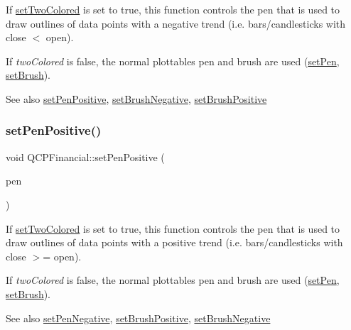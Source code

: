 If \mbox{\hyperlink{class_q_c_p_financial_a138e44aac160a17a9676652e240c5f08}{set\+Two\+Colored}} is set to true, this function controls the pen that is used to draw outlines of data points with a negative trend (i.\+e. bars/candlesticks with close $<$ open).

If {\itshape two\+Colored} is false, the normal plottable\textquotesingle{}s pen and brush are used (\mbox{\hyperlink{class_q_c_p_abstract_plottable_ab74b09ae4c0e7e13142fe4b5bf46cac7}{set\+Pen}}, \mbox{\hyperlink{class_q_c_p_abstract_plottable_a7a4b92144dca6453a1f0f210e27edc74}{set\+Brush}}).

\begin{DoxySeeAlso}{See also}
\mbox{\hyperlink{class_q_c_p_financial_ac58aa3adc7a35aab0088764b840683e5}{set\+Pen\+Positive}}, \mbox{\hyperlink{class_q_c_p_financial_a8bbdd87629f9144b3ef51af660c0961a}{set\+Brush\+Negative}}, \mbox{\hyperlink{class_q_c_p_financial_a5ebff2b1764efd07cc44942e67821829}{set\+Brush\+Positive}} 
\end{DoxySeeAlso}
\mbox{\label{class_q_c_p_financial_ac58aa3adc7a35aab0088764b840683e5}} 
\subsubsection{\texorpdfstring{setPenPositive()}{setPenPositive()}}
{\footnotesize\ttfamily void Q\+C\+P\+Financial\+::set\+Pen\+Positive (\begin{DoxyParamCaption}\item[{const Q\+Pen \&}]{pen }\end{DoxyParamCaption})}

If \mbox{\hyperlink{class_q_c_p_financial_a138e44aac160a17a9676652e240c5f08}{set\+Two\+Colored}} is set to true, this function controls the pen that is used to draw outlines of data points with a positive trend (i.\+e. bars/candlesticks with close $>$= open).

If {\itshape two\+Colored} is false, the normal plottable\textquotesingle{}s pen and brush are used (\mbox{\hyperlink{class_q_c_p_abstract_plottable_ab74b09ae4c0e7e13142fe4b5bf46cac7}{set\+Pen}}, \mbox{\hyperlink{class_q_c_p_abstract_plottable_a7a4b92144dca6453a1f0f210e27edc74}{set\+Brush}}).

\begin{DoxySeeAlso}{See also}
\mbox{\hyperlink{class_q_c_p_financial_afe5c07e94ccea01a75b3a2476993c346}{set\+Pen\+Negative}}, \mbox{\hyperlink{class_q_c_p_financial_a5ebff2b1764efd07cc44942e67821829}{set\+Brush\+Positive}}, \mbox{\hyperlink{class_q_c_p_financial_a8bbdd87629f9144b3ef51af660c0961a}{set\+Brush\+Negative}} 
\end{DoxySeeAlso}
\mbox{\label{class_q_c_p_financial_a138e44aac160a17a9676652e240c5f08}} 
